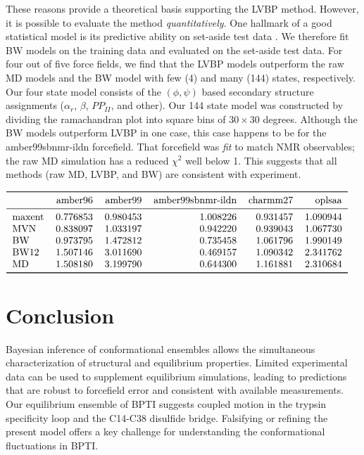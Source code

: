 \documentclass[journal=jacsat,manuscript=article]{achemso}
\begin{document}
These reasons provide a theoretical basis supporting the LVBP method.  However, it is possible to evaluate the method \emph{quantitatively}.  One hallmark of a good statistical model is its predictive ability on set-aside test data \cite{Tibshinri}.  We therefore fit BW models on the training data and evaluated on the set-aside test data.  For four out of five force fields, we find that the LVBP models outperform the raw MD models and the BW model with few (4) and many (144) states, respectively.  Our four state model consists of the $(\phi, \psi)$ based secondary structure assignments \cite{Jha2005} ($\alpha_r$, $\beta$, $PP_{II}$, and other).  Our 144 state model was constructed by dividing the ramachandran plot into square bins of $30\times30$ degrees.  Although the BW models outperform LVBP in one case, this case happens to be for the amber99sbnmr-ildn forcefield.  That forcefield was \emph{fit} to match NMR observables; the raw MD simulation has a reduced $\chi^2$ well below 1.  This suggests that all methods (raw MD, LVBP, and BW) are consistent with experiment.  

\begin{math}
\begin{tabular}{lrrrrr}
\toprule
{} &   amber96 &   amber99 &  amber99sbnmr-ildn &  charmm27 &    oplsaa \\
\midrule
maxent &  0.776853 &  0.980453 &           1.008226 &  0.931457 &  1.090944 \\
MVN    &  0.838097 &  1.033197 &           0.942220 &  0.939043 &  1.067730 \\
BW     &  0.973795 &  1.472812 &           0.735458 &  1.061796 &  1.990149 \\
BW12   &  1.507146 &  3.011690 &           0.469157 &  1.090342 &  2.341762 \\
MD     &  1.508180 &  3.199790 &           0.644300 &  1.161881 &  2.310684 \\
\bottomrule
\end{tabular}
\end{math}


\section{Conclusion}

Bayesian inference of conformational ensembles allows the simultaneous characterization of structural and equilibrium properties.  Limited experimental data can be used to supplement equilibrium simulations, leading to predictions that are robust to forcefield error and consistent with available measurements.  Our equilibrium ensemble of BPTI suggests coupled motion in the trypsin specificity loop and the C14-C38 disulfide bridge.  Falsifying or refining the present model offers a key challenge for understanding the conformational fluctuations in BPTI.
\end{document}
